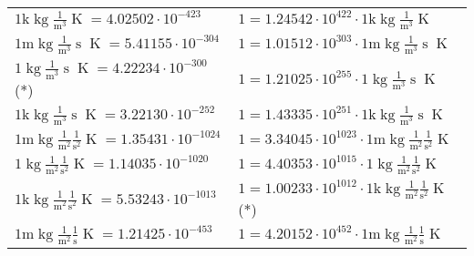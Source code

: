 \begin{center}
\begin{longtable}{l l}
{\color{gray}$1 \bm{\mathrm{ k}}\operatorname{kg}\frac1{\operatorname{m}^3}{}{}{\operatorname{K}} = 4.02502\cdot10^{-423} $}   & {\color{gray}$ 1 = 1.24542\cdot10^{422} \cdot 1 \bm{\mathrm{ k}}\operatorname{kg}\frac1{\operatorname{m}^3}{}{}{\operatorname{K}}$}  \\
{\color{gray}$1 \bm{\mathrm{ m}}\operatorname{kg}\frac1{\operatorname{m}^3}{\operatorname{s}}{}{\operatorname{K}} = 5.41155\cdot10^{-304} $}   & {\color{gray}$ 1 = 1.01512\cdot10^{303} \cdot 1 \bm{\mathrm{ m}}\operatorname{kg}\frac1{\operatorname{m}^3}{\operatorname{s}}{}{\operatorname{K}}$}  \\
{\color{black}$1 \bm{\mathrm{ }}\operatorname{kg}\frac1{\operatorname{m}^3}{\operatorname{s}}{}{\operatorname{K}} = 4.22234\cdot10^{-300} $}\quad(*) & {\color{black}$ 1 = 1.21025\cdot10^{255} \cdot 1 \bm{\mathrm{ }}\operatorname{kg}\frac1{\operatorname{m}^3}{\operatorname{s}}{}{\operatorname{K}}$}  \\
{\color{gray}$1 \bm{\mathrm{ k}}\operatorname{kg}\frac1{\operatorname{m}^3}{\operatorname{s}}{}{\operatorname{K}} = 3.22130\cdot10^{-252} $}   & {\color{gray}$ 1 = 1.43335\cdot10^{251} \cdot 1 \bm{\mathrm{ k}}\operatorname{kg}\frac1{\operatorname{m}^3}{\operatorname{s}}{}{\operatorname{K}}$}  \\
{\color{gray}$1 \bm{\mathrm{ m}}\operatorname{kg}\frac1{\operatorname{m}^2}\frac1{\operatorname{s}^2}{}{\operatorname{K}} = 1.35431\cdot10^{-1024} $}   & {\color{gray}$ 1 = 3.34045\cdot10^{1023} \cdot 1 \bm{\mathrm{ m}}\operatorname{kg}\frac1{\operatorname{m}^2}\frac1{\operatorname{s}^2}{}{\operatorname{K}}$}  \\
{\color{black}$1 \bm{\mathrm{ }}\operatorname{kg}\frac1{\operatorname{m}^2}\frac1{\operatorname{s}^2}{}{\operatorname{K}} = 1.14035\cdot10^{-1020} $}   & {\color{black}$ 1 = 4.40353\cdot10^{1015} \cdot 1 \bm{\mathrm{ }}\operatorname{kg}\frac1{\operatorname{m}^2}\frac1{\operatorname{s}^2}{}{\operatorname{K}}$}  \\
{\color{gray}$1 \bm{\mathrm{ k}}\operatorname{kg}\frac1{\operatorname{m}^2}\frac1{\operatorname{s}^2}{}{\operatorname{K}} = 5.53243\cdot10^{-1013} $}   & {\color{gray}$ 1 = 1.00233\cdot10^{1012} \cdot 1 \bm{\mathrm{ k}}\operatorname{kg}\frac1{\operatorname{m}^2}\frac1{\operatorname{s}^2}{}{\operatorname{K}}$}\quad(*)\\
{\color{gray}$1 \bm{\mathrm{ m}}\operatorname{kg}\frac1{\operatorname{m}^2}\frac1{\operatorname{s}}{}{\operatorname{K}} = 1.21425\cdot10^{-453} $}   & {\color{gray}$ 1 = 4.20152\cdot10^{452} \cdot 1 \bm{\mathrm{ m}}\operatorname{kg}\frac1{\operatorname{m}^2}\frac1{\operatorname{s}}{}{\operatorname{K}}$}  \\

\end{longtable}
\end{center}
